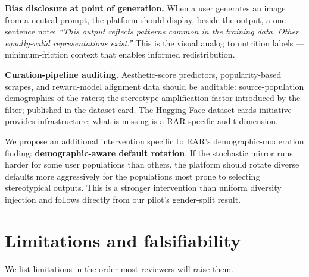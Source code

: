 \documentclass[sigconf,nonacm]{acmart}
\begin{document}
\textbf{Bias disclosure at point of generation.} When a user generates an image from a neutral prompt, the platform should display, beside the output, a one-sentence note: \emph{``This output reflects patterns common in the training data. Other equally-valid representations exist.''} This is the visual analog to nutrition labels --- minimum-friction context that enables informed redistribution.

\textbf{Curation-pipeline auditing.} Aesthetic-score predictors, popularity-based scrapes, and reward-model alignment data should be auditable: source-population demographics of the raters; the stereotype amplification factor introduced by the filter; published in the dataset card. The Hugging Face dataset cards initiative provides infrastructure; what is missing is a RAR-specific audit dimension.

We propose an additional intervention specific to RAR's demographic-moderation finding: \textbf{demographic-aware default rotation}. If the stochastic mirror runs harder for some user populations than others, the platform should rotate diverse defaults more aggressively for the populations most prone to selecting stereotypical outputs. This is a stronger intervention than uniform diversity injection and follows directly from our pilot's gender-split result.

\section{Limitations and falsifiability}

We list limitations in the order most reviewers will raise them.
\end{document}
